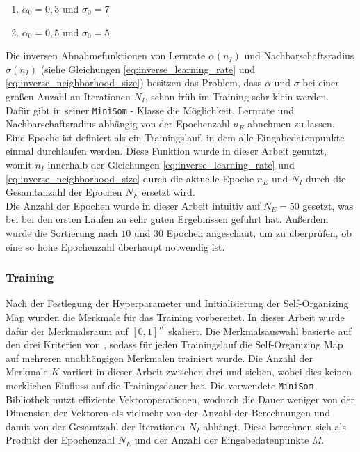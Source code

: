 \begin{enumerate}
    \item $\alpha_0 = 0,3$ und $\sigma_0 = 7$
    \item $\alpha_0 = 0,5$ und $\sigma_0 = 5$
\end{enumerate}
Die inversen Abnahmefunktionen von Lernrate $\alpha(n_I)$ und Nachbarschaftsradius $\sigma(n_I)$ (siehe Gleichungen \ref{eq:inverse_learning_rate} und \ref{eq:inverse_neighborhood_size}) besitzen das Problem, dass $\alpha$ und $\sigma$ bei einer großen Anzahl an Iterationen $N_I$, schon früh im Training sehr klein werden. Dafür gibt \textcite{vettigli_minisom_2021} in seiner \texttt{MiniSom} - Klasse die Möglichkeit, Lernrate und Nachbarschaftsradius abhängig von der Epochenzahl $n_E$ abnehmen zu lassen. Eine Epoche ist definiert als ein Trainingslauf, in dem alle Eingabedatenpunkte einmal durchlaufen werden. Diese Funktion wurde in dieser Arbeit genutzt, womit $n_I$ innerhalb der Gleichungen \ref{eq:inverse_learning_rate} und \ref{eq:inverse_neighborhood_size} durch die aktuelle Epoche $n_E$ und $N_I$ durch die Gesamtanzahl der Epochen $N_E$ ersetzt wird. \\
Die Anzahl der Epochen wurde in dieser Arbeit intuitiv auf $N_E = 50$ gesetzt, was bei bei den ersten Läufen zu sehr guten Ergebnissen geführt hat. Außerdem wurde die Sortierung nach $10$ und $30$ Epochen angeschaut, um zu überprüfen, ob eine so hohe Epochenzahl überhaupt notwendig ist. \\

\subsubsection{Training}

Nach der Festlegung der Hyperparameter und Initialisierung der Self-Organizing Map wurden die Merkmale für das Training vorbereitet. In dieser Arbeit wurde dafür der Merkmalsraum auf $[0, 1]^K$ skaliert. Die Merkmalsauswahl basierte auf den drei Kriterien von \textcite{barnes_too_2006}, sodass für jeden Trainingslauf die Self-Organizing Map auf mehreren unabhängigen Merkmalen trainiert wurde. Die Anzahl der Merkmale $K$ variiert in dieser Arbeit zwischen drei und sieben, wobei dies keinen merklichen Einfluss auf die Trainingsdauer hat. Die verwendete \texttt{MiniSom}-Bibliothek nutzt effiziente Vektoroperationen, wodurch die Dauer weniger von der Dimension der Vektoren als vielmehr von der Anzahl der Berechnungen und damit von der Gesamtzahl der Iterationen $N_I$ abhängt. Diese berechnen sich als Produkt der Epochenzahl $N_E$ und der Anzahl der Eingabedatenpunkte $M$.

